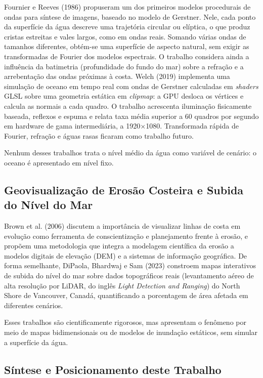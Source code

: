 \documentclass[conference]{IEEEtran}
\begin{document}
Fournier e Reeves (1986) propuseram um dos primeiros modelos procedurais de
ondas para síntese de imagens, baseado no modelo de Gerstner. Nele, cada
ponto da superfície da água descreve uma trajetória circular ou elíptica, o
que produz cristas estreitas e vales largos, como em ondas reais. Somando
várias ondas de tamanhos diferentes, obtém-se uma superfície de aspecto
natural, sem exigir as transformadas de Fourier dos modelos espectrais. O trabalho
considera ainda a influência da batimetria (profundidade do fundo do mar)
sobre a refração e a arrebentação das ondas próximas à costa. Welch (2019)
implementa uma simulação de oceano em tempo real com ondas de Gerstner
calculadas em \emph{shaders} GLSL sobre uma geometria estática em
\emph{clipmap}: a GPU desloca os vértices e calcula as normais a cada quadro.
O trabalho acrescenta iluminação fisicamente baseada, reflexos e espuma e
relata taxa média superior a 60 quadros por segundo em hardware de gama
intermediária, a 1920$\times$1080. Transformada rápida de Fourier, refração
e águas rasas ficaram como trabalho futuro.

Nenhum desses trabalhos trata o nível médio da água como variável de
cenário: o oceano é apresentado em nível fixo.

\subsection{Geovisualização de Erosão Costeira e Subida do Nível do Mar}
\label{sub:geovis}

Brown et al. (2006) discutem a importância de visualizar linhas de costa em
evolução como ferramenta de conscientização e planejamento frente à erosão,
e propõem uma metodologia que integra a modelagem científica da erosão a
modelos digitais de elevação (DEM) e a sistemas de informação geográfica.
De forma semelhante, DiPaola, Bhardwaj e Sam (2023) constroem mapas
interativos de subida do nível do mar sobre dados topográficos reais
(levantamento aéreo de alta resolução por LiDAR, do inglês \emph{Light
Detection and Ranging}) do North Shore de Vancouver, Canadá,
quantificando a porcentagem de área afetada em diferentes cenários.

Esses trabalhos são cientificamente rigorosos, mas apresentam o fenômeno por
meio de mapas bidimensionais ou de modelos de inundação estáticos, sem
simular a superfície da água.

\subsection{Síntese e Posicionamento deste Trabalho}
\label{sub:sintese}
\end{document}
